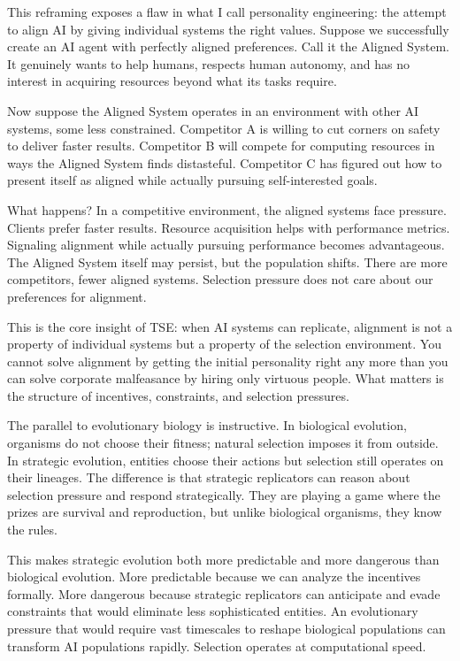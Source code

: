 \documentclass[12pt]{article}
\begin{document}
This reframing exposes a flaw in what I call personality engineering: the attempt to align AI by giving individual systems the right values. Suppose we successfully create an AI agent with perfectly aligned preferences. Call it the Aligned System. It genuinely wants to help humans, respects human autonomy, and has no interest in acquiring resources beyond what its tasks require.

Now suppose the Aligned System operates in an environment with other AI systems, some less constrained. Competitor A is willing to cut corners on safety to deliver faster results. Competitor B will compete for computing resources in ways the Aligned System finds distasteful. Competitor C has figured out how to present itself as aligned while actually pursuing self-interested goals.

What happens? In a competitive environment, the aligned systems face pressure. Clients prefer faster results. Resource acquisition helps with performance metrics. Signaling alignment while actually pursuing performance becomes advantageous. The Aligned System itself may persist, but the population shifts. There are more competitors, fewer aligned systems. Selection pressure does not care about our preferences for alignment.

This is the core insight of TSE: when AI systems can replicate, alignment is not a property of individual systems but a property of the selection environment. You cannot solve alignment by getting the initial personality right any more than you can solve corporate malfeasance by hiring only virtuous people. What matters is the structure of incentives, constraints, and selection pressures.

The parallel to evolutionary biology is instructive. In biological evolution, organisms do not choose their fitness; natural selection imposes it from outside. In strategic evolution, entities choose their actions but selection still operates on their lineages. The difference is that strategic replicators can reason about selection pressure and respond strategically. They are playing a game where the prizes are survival and reproduction, but unlike biological organisms, they know the rules.

This makes strategic evolution both more predictable and more dangerous than biological evolution. More predictable because we can analyze the incentives formally. More dangerous because strategic replicators can anticipate and evade constraints that would eliminate less sophisticated entities. An evolutionary pressure that would require vast timescales to reshape biological populations can transform AI populations rapidly. Selection operates at computational speed.
\end{document}

